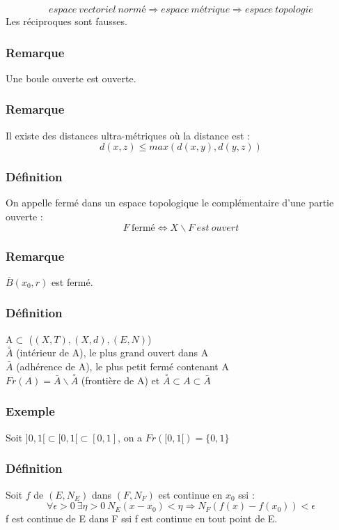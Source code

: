 \documentclass[a4paper, oneside]{report}
\newcommand{\cerc}[1]{\overset{\circ}{#1}}
\begin{document}
$$ espace~vectoriel~normé \Rightarrow espace~métrique \Rightarrow espace~topologie $$
Les réciproques sont fausses.

\subsubsection{Remarque}
Une boule ouverte est ouverte.

\subsubsection{Remarque}
Il existe des distances ultra-métriques où la distance est :
$$d(x,z)\leq max(d(x,y),d(y,z))$$

\subsubsection{Définition}
On appelle fermé dans un espace topologique le complémentaire d'une partie ouverte :
$$F~\text{fermé} \Leftrightarrow X\backslash F~est~ouvert$$

\subsubsection{Remarque}
$\bar{B}(x_0,r)$ est fermé.

\subsubsection{Définition}
A$\subset$ ($(X,T), (X,d), (E,N)$)\\
$\cerc{A}$ (intérieur de A), le plus grand ouvert dans A\\
$\bar{A}$ (adhérence de A), le plus petit fermé contenant A\\
$Fr(A)= \bar{A} \backslash \cerc{A}$ (frontière de A) et $\cerc{A}\subset A \subset \bar{A}$\\

\subsubsection{Exemple}
Soit $]0,1[ \subset [0,1[ \subset [0,1]$, on a $Fr([0,1[)=\{0,1\}$

\subsubsection{Définition}
Soit $f$ de $(E,N_E)$ dans $(F,N_F)$ est continue en $x_0$ ssi :
$$\forall\epsilon >0~\exists \eta>0~N_E(x-x_0)< \eta \Rightarrow N_F(f(x)-f(x_0))<\epsilon$$
f est continue de E dans F ssi f est continue en tout point de E.
\end{document}
